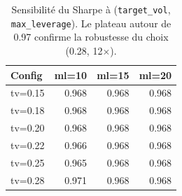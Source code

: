 \begin{table}[H]
\centering
\caption{Sensibilité du Sharpe à (\texttt{target\_vol}, \texttt{max\_leverage}). Le plateau autour de 0.97 confirme la robustesse du choix (0.28, 12$\times$).}
\label{tab:sensitivity}
\begin{tabular}{lrrr}
\toprule
Config & ml=10 & ml=15 & ml=20 \\
\midrule
tv=0.15 & 0.968 & 0.968 & 0.968 \\
tv=0.18 & 0.968 & 0.968 & 0.968 \\
tv=0.20 & 0.968 & 0.968 & 0.968 \\
tv=0.22 & 0.966 & 0.968 & 0.968 \\
tv=0.25 & 0.965 & 0.968 & 0.968 \\
tv=0.28 & 0.971 & 0.968 & 0.968 \\
\bottomrule
\end{tabular}
\end{table}
